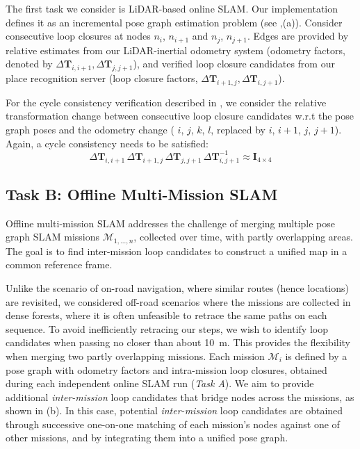 The first task we consider is LiDAR-based online SLAM. Our implementation defines it as an incremental pose graph estimation problem (see ,(a)). Consider consecutive loop closures at nodes $n_{i}$, $n_{i+1}$ and $n_{j}$, $n_{j+1}$. Edges are provided by relative estimates from our LiDAR-inertial odometry system (odometry factors, denoted by $\Delta\mathbf{T}_{i,i+1}, \Delta\mathbf{T}_{j, j+1}$), and verified loop closure candidates from our place recognition server (loop closure factors, $\Delta\mathbf{T}_{i+1, j}, \Delta\mathbf{T}_{i, j+1}$).

For the cycle consistency verification described in , we consider the relative transformation change between consecutive loop closure candidates w.r.t the pose graph poses and the odometry change (  $i$, $j$, $k$, $l$, replaced by ${i}$, ${i+1}$, ${j}$, ${j+1}$). Again, a cycle consistency needs to be satisfied:
\begin{equation}
  \label{eq:cycle-online}
  \Delta\mathbf{T}_{i,i+1}\, \Delta\mathbf{T}_{i+1, j}\, \Delta\mathbf{T}_{j, j+1}\, \Delta\mathbf{T}_{i, j+1}^{-1} \approx \mathbf{I}_{4\times4}
\end{equation}


\subsection{Task B: Offline Multi-Mission SLAM}\label{sec:offline}
Offline multi-mission SLAM addresses the challenge of merging multiple pose graph SLAM missions ${\mathcal{M}_{1, \ldots, n}}$, collected over time, with partly overlapping areas. 
The goal is to find inter-mission loop candidates to construct a unified map in a common reference frame. 

Unlike the scenario of on-road navigation, where similar routes (hence locations) are revisited, we considered off-road scenarios where the missions are collected in dense forests, where it is often unfeasible to retrace the same paths on each sequence. To avoid inefficiently retracing our steps, we wish to identify loop candidates when passing no closer than about \SI{10}{\meter}. This provides the flexibility when merging two partly overlapping missions.
Each mission ${\mathcal{M}_{i}}$ is defined by a pose graph with odometry factors and intra-mission loop closures, obtained during each independent online SLAM run (\emph{Task A}). We aim to provide additional \emph{inter-mission} loop candidates that bridge nodes across the missions, as shown in  (b). In this case, potential \emph{inter-mission} loop candidates are obtained through successive one-on-one matching of each mission's nodes against one of other missions, and by integrating them into a unified pose graph.

